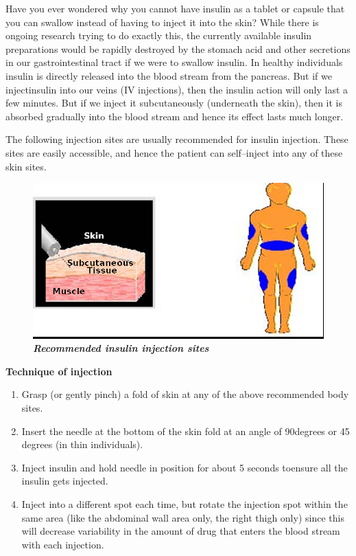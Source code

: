 Have you ever wondered why you cannot have insulin as a tablet or capsule that you can swallow instead of having to inject it into the skin? While there is ongoing research trying to do exactly this, the currently available insulin preparations would be rapidly destroyed by the stomach acid and other secretions in our gastrointestinal tract if we were to swallow insulin. In healthy individuals insulin is directly released into the blood stream from the pancreas. But if we inject\break insulin into our veins (IV injections), then the insulin action will only last a few minutes. But if we inject it subcutaneously (underneath the skin), then it is absorbed gradually into the blood stream and hence its effect lasts much longer.

The following injection sites are usually recommended for insulin injection. These sites are easily accessible, and hence the patient can self–inject into any of these skin sites.

\begin{figure}[h]
\centering
\includegraphics[scale=1.6]{images/088.jpg}\\
\textbf{\textit{Recommended insulin injection sites}}
\end{figure}

\clearpage

\noindent\textbf{Technique of injection}

\vspace{-\topsep}
\begin{enumerate}[•]
\itemsep=0pt
\item Grasp (or gently pinch) a fold of skin at any of the above reco\-mmended body sites.
\item Insert the needle at the bottom of the skin fold at an angle of 90\break degrees or 45 degrees (in thin individuals).
\item Inject insulin and hold needle in position for about 5 seconds to\break ensure all the insulin gets injected.
\item Inject into a different spot each time, but rotate the injection spot within the same area (like the abdominal wall area only, the right thigh only) since this will decrease variability in the amount of drug that enters the blood stream with each injection.
\end{enumerate}


